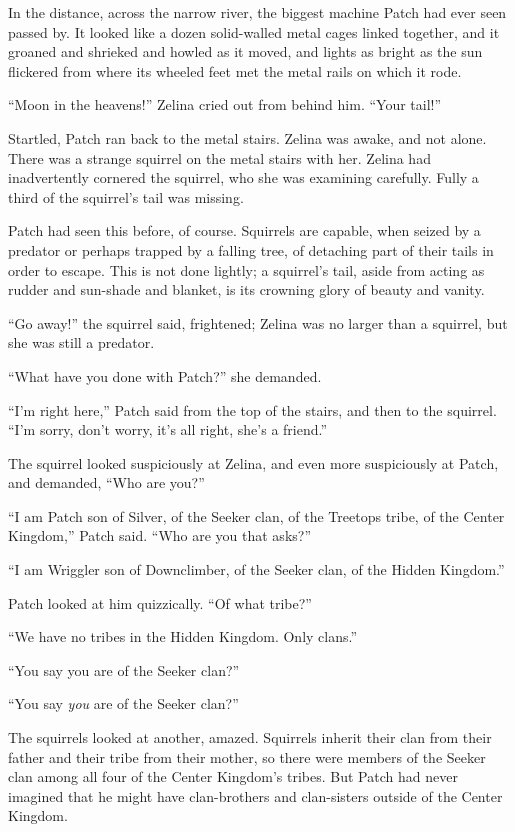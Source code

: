 \documentclass[ebook,oneside,openany,12pt]{memoir}
\begin{document}
In the distance, across the narrow river, the biggest machine Patch
had ever seen passed by. It looked like a dozen solid-walled metal
cages linked together, and it groaned and shrieked and howled as it
moved, and lights as bright as the sun flickered from where its
wheeled feet met the metal rails on which it rode.

“Moon in the heavens!” Zelina cried out from behind him. “Your tail!”

Startled, Patch ran back to the metal stairs. Zelina was awake, and
not alone. There was a strange squirrel on the metal stairs with
her. Zelina had inadvertently cornered the squirrel, who she was
examining carefully. Fully a third of the squirrel’s tail was missing.

Patch had seen this before, of course. Squirrels are capable, when
seized by a predator or perhaps trapped by a falling tree, of
detaching part of their tails in order to escape. This is not done
lightly; a squirrel’s tail, aside from acting as rudder and sun-shade
and blanket, is its crowning glory of beauty and vanity.

“Go away!” the squirrel said, frightened; Zelina was no larger than a
squirrel, but she was still a predator.

“What have you done with Patch?” she demanded.

“I’m right here,” Patch said from the top of the stairs, and then to
the squirrel. “I’m sorry, don’t worry, it’s all right, she’s a
friend.”

The squirrel looked suspiciously at Zelina, and even more suspiciously
at Patch, and demanded, “Who are you?”

“I am Patch son of Silver, of the Seeker clan, of the Treetops tribe,
of the Center Kingdom,” Patch said. “Who are you that asks?”

“I am Wriggler son of Downclimber, of the Seeker clan, of the Hidden
Kingdom.”

Patch looked at him quizzically. “Of what tribe?”

“We have no tribes in the Hidden Kingdom. Only clans.”

“You say you are of the Seeker clan?”

“You say \emph{you} are of the Seeker clan?”

The squirrels looked at another, amazed. Squirrels inherit their clan
from their father and their tribe from their mother, so there were
members of the Seeker clan among all four of the Center Kingdom’s
tribes. But Patch had never imagined that he might have clan-brothers
and clan-sisters outside of the Center Kingdom.
\end{document}
